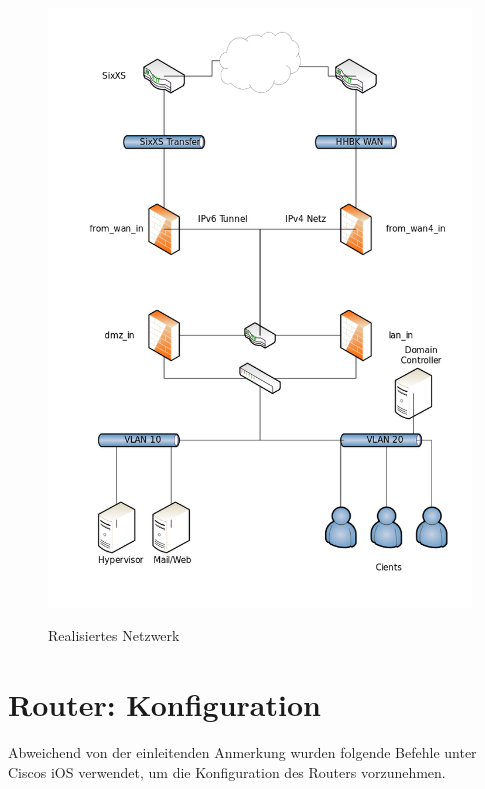 \begin{figure}
\includegraphics[scale=0.5]{8gruppe_dokumentation_pictures/02_JahresProjekt_Netzwerkplan.png}
\label{realisiertes_netzwerk}
\caption{Realisiertes Netzwerk}
\end{figure}
\section{Router: Konfiguration}

Abweichend von der einleitenden Anmerkung wurden folgende Befehle unter Ciscos iOS verwendet, um die Konfiguration des Routers vorzunehmen.

